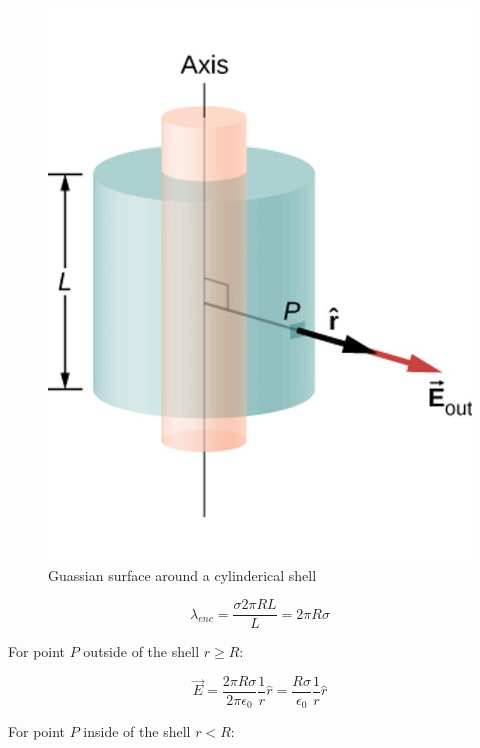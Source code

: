 \documentclass[14pt]{memoir}
\begin{document}
\begin{figure}[H]
\begin{center}
\includegraphics[scale=0.40]{fig/fig_06_30.jpg}
\caption{Guassian surface around a cylinderical shell}
\label{fig:06_30}
\end{center}
\end{figure}

\begin{equation}
\lambda_{enc} = \frac{\sigma 2 \pi R L}{L} = 2 \pi R \sigma
\end{equation} 

For point $P$ outside of the shell $r \geq R$:

\begin{equation}
\vec{E} = \frac{2 \pi R \sigma}{2 \pi \epsilon_0} \frac{1}{r} \hat{r} = \frac{ R \sigma}{ \epsilon_0} \frac{1}{r} \hat{r}
\end{equation}

For point $P$ inside of the shell $r < R$:
\end{document}
